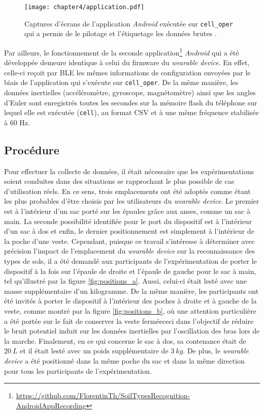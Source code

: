 \begin{figure}[H]
	\centering
	\texttt{[image: chapter4/application.pdf]}
        \caption[Captures d'écran de l'application \textit{Android} exécutée sur \texttt{cell\_oper} qui a permis le pilotage et l'étiquetage des données brutes.]{Captures d'écrans de l'application \textit{Android} exécutée sur \texttt{cell\_oper} qui a permis de le pilotage et l'étiquetage les données brutes \citep{Thullier2017}.}
	\label{fig:application}
\end{figure}

Par ailleurs, le fonctionnement de la seconde application\footnote{\url{https://github.com/FlorentinTh/SoilTypesRecognition-AndroidAppRecording}} \textit{Android} qui a été développée demeure identique à celui du firmware du \textit{wearable device}. En effet, celle-ci reçoit par \acs{BLE} les mêmes informations de configuration envoyées par le biais de l'application qui s'exécute sur \texttt{cell\_oper}. De la même manière, les données inertielles (accéléromètre, gyroscope, magnétomètre) ainsi que les angles d'Euler sont enregistrés toutes les secondes sur la mémoire flash du téléphone sur lequel elle est exécutée (\texttt{cell}), au format \acs{CSV} et à une même fréquence stabilisée à 60 Hz.

\subsection{Procédure}
Pour effectuer la collecte de données, il était nécessaire que les expérimentations soient conduites dans des situations se rapprochant le plus possible de cas d'utilisation réels. En ce sens, trois emplacements ont été adoptés comme étant les plus probables d'être choisis par les utilisateurs du \textit{wearable device}. Le premier est à l'intérieur d'un sac porté sur les épaules grâce aux anses, comme un sac à main. La seconde possibilité identifiée pour le port du dispositif est à l'intérieur d'un sac à dos et enfin, le dernier positionnement est simplement à l'intérieur de la poche d'une veste. Cependant, puisque ce travail s'intéresse à déterminer avec précision l'impact de l'emplacement du \textit{wearable device} sur la reconnaissance des types de sols, il a été demandé aux participants de l'expérimentation de porter le dispositif à la fois sur l'épaule de droite et l'épaule de gauche pour le sac à main, tel qu'illustré par la figure \ref{fig:positions_a}. Aussi, celui-ci était lesté avec une masse supplémentaire d'un kilogramme. De la même manière, les participants ont été invités à porter le dispositif à l'intérieur des poches à droite et à gauche de la veste, comme montré par la figure \ref{fig:positions_b}, où une attention particulière a été portée sur le fait de conserver la veste fermée\textemdash ceci dans l'objectif de réduire le bruit potentiel induit sur les données inertielles par l'oscillation des bras lors de la marche. Finalement, en ce qui concerne le sac à dos, sa contenance était de $20\:L$ et il était lesté avec un poids supplémentaire de $3\:kg$. De plus, le \textit{wearable device} a été positionné dans la même poche du sac et dans la même direction pour tous les participants de l'expérimentation.

